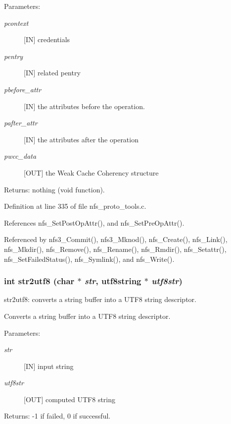 \begin{Desc}
\item[Parameters:]
\begin{description}
\item[{\em pcontext}][IN] credentials \item[{\em pentry}][IN] related pentry \item[{\em pbefore\_\-attr}][IN] the attributes before the operation. \item[{\em pafter\_\-attr}][IN] the attributes after the operation \item[{\em pwcc\_\-data}][OUT] the Weak Cache Coherency structure\end{description}
\end{Desc}
\begin{Desc}
\item[Returns:]nothing (void function). \end{Desc}


Definition at line 335 of file nfs\_\-proto\_\-tools.c.

References nfs\_\-Set\-Post\-Op\-Attr(), and nfs\_\-Set\-Pre\-Op\-Attr().

Referenced by nfs3\_\-Commit(), nfs3\_\-Mknod(), nfs\_\-Create(), nfs\_\-Link(), nfs\_\-Mkdir(), nfs\_\-Remove(), nfs\_\-Rename(), nfs\_\-Rmdir(), nfs\_\-Setattr(), nfs\_\-Set\-Failed\-Status(), nfs\_\-Symlink(), and nfs\_\-Write().
\subsubsection{\setlength{\rightskip}{0pt plus 5cm}int str2utf8 (char $\ast$ {\em str}, utf8string $\ast$ {\em utf8str})}\label{nfs__proto__tools_8c_a14}


str2utf8: converts a string buffer into a UTF8 string descriptor.

Converts a string buffer into a UTF8 string descriptor.

\begin{Desc}
\item[Parameters:]
\begin{description}
\item[{\em str}][IN] input string \item[{\em utf8str}][OUT] computed UTF8 string\end{description}
\end{Desc}
\begin{Desc}
\item[Returns:]-1 if failed, 0 if successful. \end{Desc}


